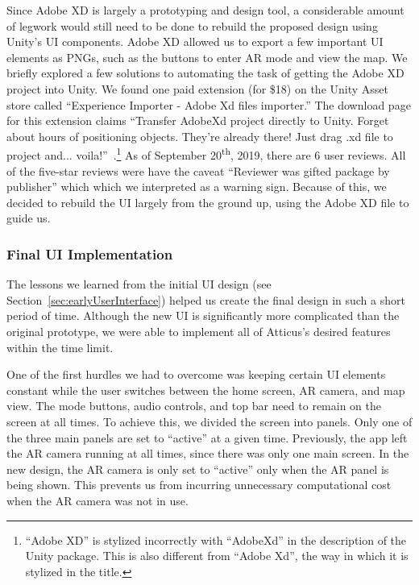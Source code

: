 \documentclass[a4paper, 10pt, american, titlepage]{article}
\begin{document}
Since Adobe XD is largely a prototyping and design tool, a considerable amount
of legwork would still need to be done to rebuild the proposed design using
Unity's UI components. Adobe XD allowed us to export a few important UI elements
as PNGs, such as the buttons to enter AR mode and view the map. We briefly
explored a few solutions to automating the task of getting the Adobe XD project
into Unity. We found one paid extension (for \$18) on the Unity Asset store
called ``Experience Importer - Adobe Xd files importer.'' The download page for
this extension claims ``Transfer AdobeXd project directly to Unity. Forget about
hours of positioning objects. They're already there! Just drag .xd file to
project and... voila!''~\autocite{glasseye2019}.\footnote{``Adobe XD'' is
stylized incorrectly with ``AdobeXd'' in the description of the Unity package.
This is also different from ``Adobe Xd'', the way in which it is stylized in the
title.} As of September 20\textsuperscript{th}, 2019, there are 6 user reviews.
All of the five-star reviews were have the caveat ``Reviewer was gifted package
by publisher'' which which we interpreted as a warning sign. Because of this, we
decided to rebuild the UI largely from the ground up, using the Adobe XD file to
guide us.

\subsubsection{Final UI Implementation}
\label{sec:finalUI}

The lessons we learned from the initial UI design (see
Section~\ref{sec:earlyUserInterface}) helped us create the final design in such
a short period of time. Although the new UI is significantly more complicated
than the original prototype, we were able to implement all of Atticus's desired
features within the time limit.

One of the first hurdles we had to overcome was keeping certain UI elements
constant while the user switches between the home screen, AR camera, and map
view. The mode buttons, audio controls, and top bar need to remain on the screen
at all times. To achieve this, we divided the screen into panels. Only one of
the three main panels are set to ``active'' at a given time. Previously, the app
left the AR camera running at all times, since there was only one main screen.
In the new design, the AR camera is only set to ``active'' only when the AR
panel is being shown. This prevents us from incurring unnecessary computational
cost when the AR camera was not in use.
\end{document}
